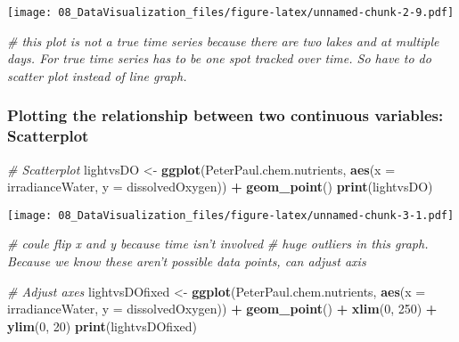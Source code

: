\documentclass[]{article}
\newenvironment{Shaded}{\begin{snugshade}}{\end{snugshade}}
\newcommand{\KeywordTok}[1]{\textcolor[rgb]{0.13,0.29,0.53}{\textbf{#1}}}
\newcommand{\DataTypeTok}[1]{\textcolor[rgb]{0.13,0.29,0.53}{#1}}
\newcommand{\DecValTok}[1]{\textcolor[rgb]{0.00,0.00,0.81}{#1}}
\newcommand{\StringTok}[1]{\textcolor[rgb]{0.31,0.60,0.02}{#1}}
\newcommand{\CommentTok}[1]{\textcolor[rgb]{0.56,0.35,0.01}{\textit{#1}}}
\newcommand{\OperatorTok}[1]{\textcolor[rgb]{0.81,0.36,0.00}{\textbf{#1}}}
\newcommand{\NormalTok}[1]{#1}
\begin{document}
\texttt{[image: 08\_DataVisualization\_files/figure-latex/unnamed-chunk-2-9.pdf]}

\begin{Shaded}
\begin{Highlighting}[]
\CommentTok{# this plot is not a true time series because there are two lakes and at multiple days. For true time series has to be one spot tracked over time. So have to do scatter plot instead of line graph.}
\end{Highlighting}
\end{Shaded}

\subsubsection{Plotting the relationship between two continuous
variables:
Scatterplot}\label{plotting-the-relationship-between-two-continuous-variables-scatterplot}

\begin{Shaded}
\begin{Highlighting}[]
\CommentTok{# Scatterplot}
\NormalTok{lightvsDO <-}\StringTok{ }
\StringTok{  }\KeywordTok{ggplot}\NormalTok{(PeterPaul.chem.nutrients, }\KeywordTok{aes}\NormalTok{(}\DataTypeTok{x =}\NormalTok{ irradianceWater, }\DataTypeTok{y =}\NormalTok{ dissolvedOxygen)) }\OperatorTok{+}
\StringTok{  }\KeywordTok{geom_point}\NormalTok{()}
\KeywordTok{print}\NormalTok{(lightvsDO)}
\end{Highlighting}
\end{Shaded}

\texttt{[image: 08\_DataVisualization\_files/figure-latex/unnamed-chunk-3-1.pdf]}

\begin{Shaded}
\begin{Highlighting}[]
\CommentTok{# coule flip x and y because time isn't involved }
\CommentTok{# huge outliers in this graph. Because we know these aren't possible data points, can adjust axis}


\CommentTok{# Adjust axes}
\NormalTok{lightvsDOfixed <-}\StringTok{ }
\StringTok{  }\KeywordTok{ggplot}\NormalTok{(PeterPaul.chem.nutrients, }\KeywordTok{aes}\NormalTok{(}\DataTypeTok{x =}\NormalTok{ irradianceWater, }\DataTypeTok{y =}\NormalTok{ dissolvedOxygen)) }\OperatorTok{+}
\StringTok{  }\KeywordTok{geom_point}\NormalTok{() }\OperatorTok{+}
\StringTok{  }\KeywordTok{xlim}\NormalTok{(}\DecValTok{0}\NormalTok{, }\DecValTok{250}\NormalTok{) }\OperatorTok{+}
\StringTok{  }\KeywordTok{ylim}\NormalTok{(}\DecValTok{0}\NormalTok{, }\DecValTok{20}\NormalTok{)}
\KeywordTok{print}\NormalTok{(lightvsDOfixed)}
\end{Highlighting}
\end{Shaded}
\end{document}
